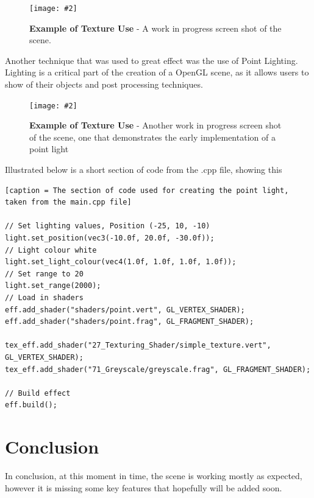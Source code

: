 \documentclass[10pt, a4paper]{article}
\newcommand{\figuremacro}[5]{
    \begin{figure}[#1]
        \centering
        \texttt{[image: \#2]}
        \caption[#3]{\textbf{#3}#4}
        \label{fig:#2}
    \end{figure}
}
\begin{document}
     \figuremacro{h}{wip}{Example of Texture Use}{ - A work in progress screen shot of the scene.}{1.0}
    
   Another technique that was used to great effect was the use of Point Lighting. Lighting is a critical part of the creation of a OpenGL scene, as it allows users to show of their objects and post processing techniques.
   
   \figuremacro{h}{point_light}{Example of Texture Use}{ - Another work in progress screen shot of the scene, one that demonstrates the early implementation of a point light}{1.0}
   
   Illustrated below is a short section of code from the .cpp file, showing this
    
 \begin{lstlisting}[caption = The section of code used for creating the point light, taken from the main.cpp file] 

// Set lighting values, Position (-25, 10, -10)
light.set_position(vec3(-10.0f, 20.0f, -30.0f));
// Light colour white
light.set_light_colour(vec4(1.0f, 1.0f, 1.0f, 1.0f));
// Set range to 20
light.set_range(2000);
// Load in shaders
eff.add_shader("shaders/point.vert", GL_VERTEX_SHADER);
eff.add_shader("shaders/point.frag", GL_FRAGMENT_SHADER);

tex_eff.add_shader("27_Texturing_Shader/simple_texture.vert", GL_VERTEX_SHADER);
tex_eff.add_shader("71_Greyscale/greyscale.frag", GL_FRAGMENT_SHADER);

// Build effect
eff.build();

\end{lstlisting}




	
\section{Conclusion}
In conclusion, at this moment in time, the scene is working mostly as expected, however it is missing some key features that hopefully will be added soon. 
	

		
\end{document}
